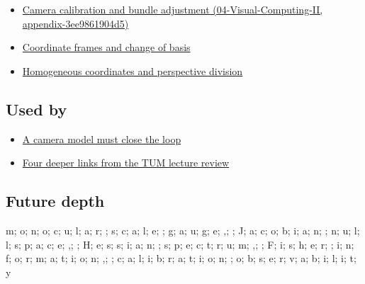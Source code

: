 \begin{itemize}
\tightlist
\item
  \href{../04-Visual-Computing-II/main.pdf\#nameddest=appendix-3ee9861904d5}{Camera calibration and bundle adjustment (04-Visual-Computing-II, appendix-3ee9861904d5)}
\item
  \hyperref[appendix-1bae9457dbc3]{Coordinate frames and change of basis}
\item
  \hyperref[appendix-cb3b26862282]{Homogeneous coordinates and perspective division}
\end{itemize}

\subsection{Used by}\label{appendix-113f0267e5f4-used-by}

\begin{itemize}
\tightlist
\item
  \hyperref[02-foundations-ii-ch037-a-camera-model-must-close-the-loop]{A camera model must close the loop}
\item
  \hyperref[02-foundations-ii-ch036-four-deeper-links-from-the-tum-lecture-review]{Four deeper links from the TUM lecture review}
\end{itemize}

\subsection{Future depth}\label{appendix-113f0267e5f4-future-depth}

m; o; n; o; c; u; l; a; r; ; s; c; a; l; e; ; g; a; u; g; e; ,; ; J; a; c; o; b; i; a; n; ; n; u; l; l; s; p; a; c; e; ,; ; H; e; s; s; i; a; n; ; s; p; e; c; t; r; u; m; ,; ; F; i; s; h; e; r; ; i; n; f; o; r; m; a; t; i; o; n; ,; ; c; a; l; i; b; r; a; t; i; o; n; ; o; b; s; e; r; v; a; b; i; l; i; t; y
